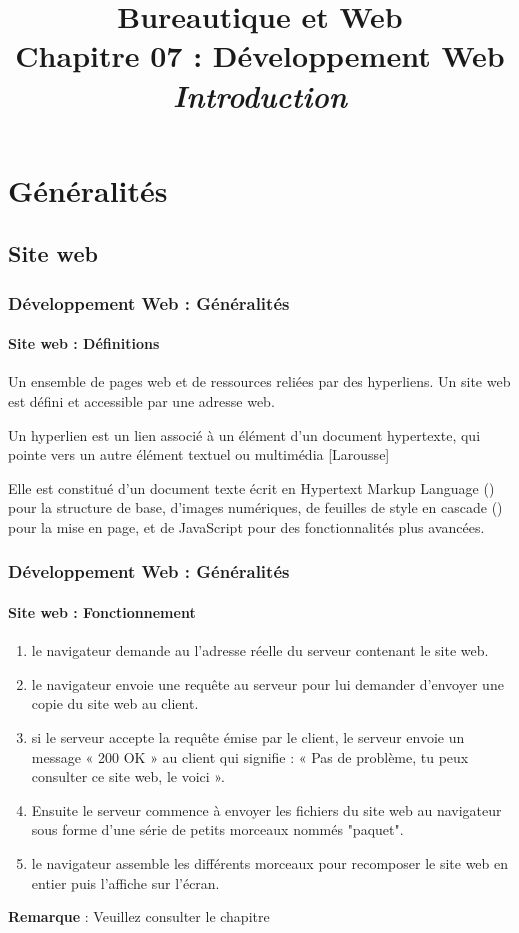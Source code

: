 \documentclass[xcolor=table]{beamer}
\title[BWEB : 08- Web (HTML)] %
{Bureautique et Web \\Chapitre 07 : Développement Web\\ \slshape\small  Introduction}
\begin{document}
	
\section{Généralités}

%
%

\subsection{Site web}

\begin{frame}
\frametitle{Développement Web : Généralités}
\framesubtitle{Site web : Définitions}

\begin{definition}
	Un ensemble de pages web et de ressources reliées par des hyperliens.
	Un site web est défini et accessible par une adresse web.
	
	Un hyperlien est un lien associé à un élément d'un document hypertexte, qui pointe vers un autre élément textuel ou multimédia [Larousse]
\end{definition}

\begin{definition}
	Elle est constitué d'un document texte écrit en Hypertext Markup Language () pour la structure de base, d'images numériques, de feuilles de style en cascade () pour la mise en page, et de JavaScript pour des fonctionnalités plus avancées. 
\end{definition}

\end{frame}

\begin{frame}
\frametitle{Développement Web : Généralités}
\framesubtitle{Site web : Fonctionnement}

\begin{enumerate}
	\item le navigateur demande au  l'adresse réelle du serveur contenant le site web.
	\item le navigateur envoie une requête  au serveur pour lui demander d'envoyer une copie du site web au client. 
	\item si le serveur accepte la requête émise par le client, le serveur envoie un message « 200 OK » au client qui signifie : « Pas de problème, tu peux consulter ce site web, le voici ». 
	\item Ensuite le serveur commence à envoyer les fichiers du site web au navigateur sous forme d'une série de petits morceaux nommés "paquet".
	\item le navigateur assemble les différents morceaux pour recomposer le site web en entier puis l'affiche sur l'écran.
\end{enumerate}

\textbf{Remarque} : Veuillez consulter le chapitre 

\end{frame}
\end{document}
